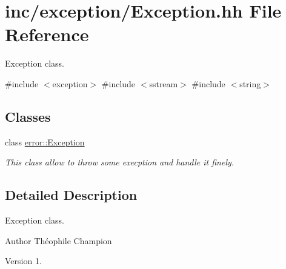 \hypertarget{Exception_8hh}{}\section{inc/exception/\+Exception.hh File Reference}
\label{Exception_8hh}


Exception class.  


{\ttfamily \#include $<$exception$>$}\newline
{\ttfamily \#include $<$sstream$>$}\newline
{\ttfamily \#include $<$string$>$}\newline
\subsection*{Classes}
\begin{DoxyCompactItemize}
\item 
class \hyperlink{classerror_1_1Exception}{error\+::\+Exception}
\begin{DoxyCompactList}\small\item\em This class allow to throw some execption and handle it finely. \end{DoxyCompactList}\end{DoxyCompactItemize}


\subsection{Detailed Description}
Exception class. 

\begin{DoxyAuthor}{Author}
Théophile Champion 
\end{DoxyAuthor}
\begin{DoxyVersion}{Version}
1. 
\end{DoxyVersion}
